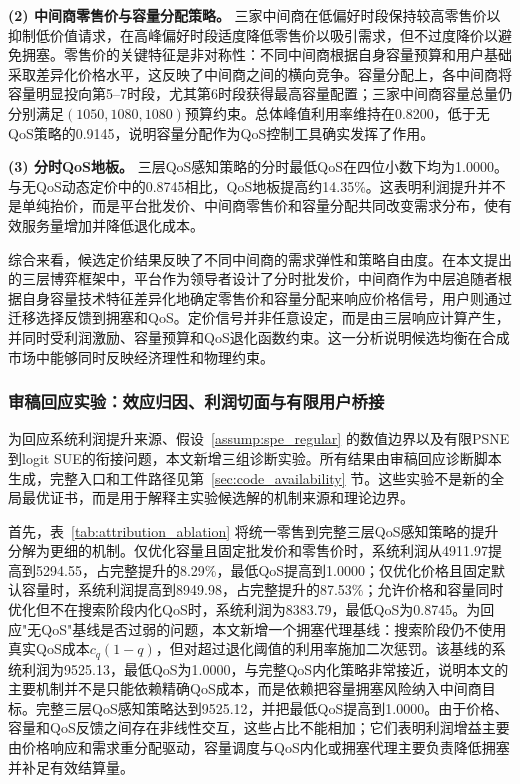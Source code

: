 \documentclass[UTF8,11pt]{ctexart}
\begin{document}
\textbf{(2) 中间商零售价与容量分配策略。} 三家中间商在低偏好时段保持较高零售价以抑制低价值请求，在高峰偏好时段适度降低零售价以吸引需求，但不过度降价以避免拥塞。零售价的关键特征是非对称性：不同中间商根据自身容量预算和用户基础采取差异化价格水平，这反映了中间商之间的横向竞争。容量分配上，各中间商将容量明显投向第5--7时段，尤其第6时段获得最高容量配置；三家中间商容量总量仍分别满足$(1050,1080,1080)$预算约束。总体峰值利用率维持在0.8200，低于无QoS策略的0.9145，说明容量分配作为QoS控制工具确实发挥了作用。

\textbf{(3) 分时QoS地板。} 三层QoS感知策略的分时最低QoS在四位小数下均为1.0000。与无QoS动态定价中的0.8745相比，QoS地板提高约14.35\%。这表明利润提升并不是单纯抬价，而是平台批发价、中间商零售价和容量分配共同改变需求分布，使有效服务量增加并降低退化成本。

综合来看，候选定价结果反映了不同中间商的需求弹性和策略自由度。在本文提出的三层博弈框架中，平台作为领导者设计了分时批发价，中间商作为中层追随者根据自身容量技术特征差异化地确定零售价和容量分配来响应价格信号，用户则通过迁移选择反馈到拥塞和QoS。定价信号并非任意设定，而是由三层响应计算产生，并同时受利润激励、容量预算和QoS退化函数约束。这一分析说明候选均衡在合成市场中能够同时反映经济理性和物理约束。

\subsubsection{审稿回应实验：效应归因、利润切面与有限用户桥接}
\label{sec:reviewer_response_diagnostics}

为回应系统利润提升来源、假设~\ref{assump:spe_regular} 的数值边界以及有限PSNE到logit SUE的衔接问题，本文新增三组诊断实验。所有结果由审稿回应诊断脚本生成，完整入口和工件路径见第~\ref{sec:code_availability} 节。这些实验不是新的全局最优证书，而是用于解释主实验候选解的机制来源和理论边界。

首先，表~\ref{tab:attribution_ablation} 将统一零售到完整三层QoS感知策略的提升分解为更细的机制。仅优化容量且固定批发价和零售价时，系统利润从4911.97提高到5294.55，占完整提升的8.29\%，最低QoS提高到1.0000；仅优化价格且固定默认容量时，系统利润提高到8949.98，占完整提升的87.53\%；允许价格和容量同时优化但不在搜索阶段内化QoS时，系统利润为8383.79，最低QoS为0.8745。为回应"无QoS"基线是否过弱的问题，本文新增一个拥塞代理基线：搜索阶段仍不使用真实QoS成本$c_q(1-q)$，但对超过退化阈值的利用率施加二次惩罚。该基线的系统利润为9525.13，最低QoS为1.0000，与完整QoS内化策略非常接近，说明本文的主要机制并不是只能依赖精确QoS成本，而是依赖把容量拥塞风险纳入中间商目标。完整三层QoS感知策略达到9525.12，并把最低QoS提高到1.0000。由于价格、容量和QoS反馈之间存在非线性交互，这些占比不能相加；它们表明利润增益主要由价格响应和需求重分配驱动，容量调度与QoS内化或拥塞代理主要负责降低拥塞并补足有效结算量。
\end{document}
